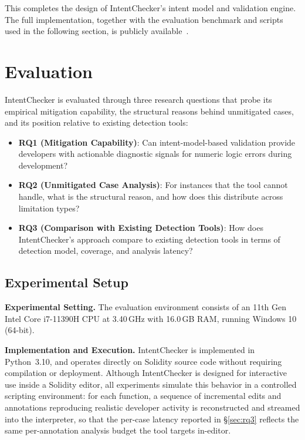 \documentclass[pdflatex,sn-basic]{sn-jnl}%
\theoremstyle{thmstyleone}%
\theoremstyle{thmstyletwo}%
\theoremstyle{thmstylethree}%
\begin{document}
This completes the design of IntentChecker's intent model and validation engine. The full implementation, together with the evaluation benchmark and scripts used in the following section, is publicly available~\citep{intentchecker}.

\section{Evaluation}\label{sec:evaluation}

IntentChecker is evaluated through three research questions that probe its empirical mitigation capability, the structural reasons behind unmitigated cases, and its position relative to existing detection tools:

\begin{itemize}
    \item \textbf{RQ1 (Mitigation Capability)}: Can intent-model-based validation provide developers with actionable diagnostic signals for numeric logic errors during development?
    \item \textbf{RQ2 (Unmitigated Case Analysis)}: For instances that the tool cannot handle, what is the structural reason, and how does this distribute across limitation types?
    \item \textbf{RQ3 (Comparison with Existing Detection Tools)}: How does IntentChecker's approach compare to existing detection tools in terms of detection model, coverage, and analysis latency?
\end{itemize}

\subsection{Experimental Setup}\label{sec:setup}

\noindent\textbf{Experimental Setting.}
The evaluation environment consists of an 11th Gen Intel\textregistered{} Core\texttrademark{}
i7-11390H CPU at 3.40\,GHz with 16.0\,GB RAM, running Windows 10 (64-bit).

\smallskip
\noindent\textbf{Implementation and Execution.}
IntentChecker is implemented in Python~3.10, and operates directly on Solidity source code without requiring compilation or deployment.
Although IntentChecker is designed for interactive use inside a Solidity editor, all experiments simulate this behavior in a controlled scripting environment: for each function, a sequence of incremental edits and annotations reproducing realistic developer activity is reconstructed and streamed into the interpreter, so that the per-case latency reported in \S\ref{sec:rq3} reflects the same per-annotation analysis budget the tool targets in-editor.
\end{document}
